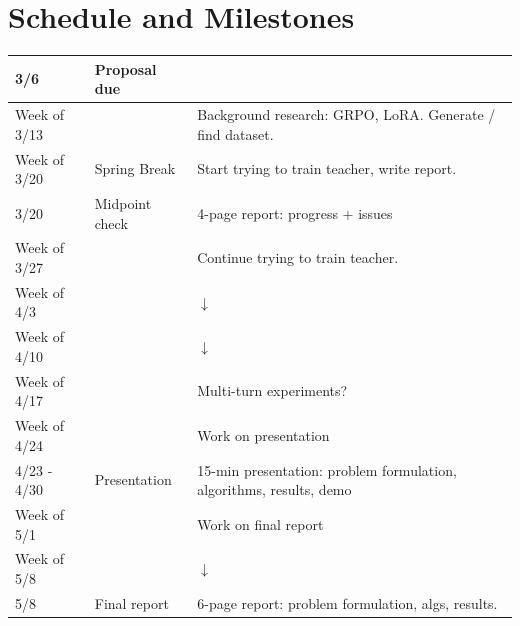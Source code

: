 \documentclass{article}
\begin{document}
\section{Schedule and Milestones}
\renewcommand{\arraystretch}{1.2}
\begin{tabular}{ |l|l|l| } 
 \hline
 3/6 & \cellcolor{red} Proposal due & \\
 \hline

 Week of 3/13 & & Background research: GRPO, LoRA. Generate / find dataset.\\
 \hline
 Week of 3/20 & \cellcolor{green} Spring Break & Start trying to train teacher, write report.\\
 \hline

 3/20 & \cellcolor{red} Midpoint check & 4-page report: progress + issues\\
 \hline

 Week of 3/27 & & Continue trying to train teacher.\\
 \hline
 Week of 4/3 & & $\downarrow$\\
 \hline
 Week of 4/10 & & $\downarrow$\\
 \hline
 Week of 4/17 & & Multi-turn experiments?\\
 \hline
 Week of 4/24 & & Work on presentation\\
 \hline

 4/23 - 4/30 & \cellcolor{red} Presentation & 15-min presentation: problem formulation, algorithms, results, demo \\
 \hline

 Week of 5/1 & & Work on final report\\
 \hline
 Week of 5/8 & & $\downarrow$\\
 \hline

 5/8 & \cellcolor{red} Final report & 6-page report: problem formulation, algs, results. \\
 \hline
\end{tabular}

\end{document}
